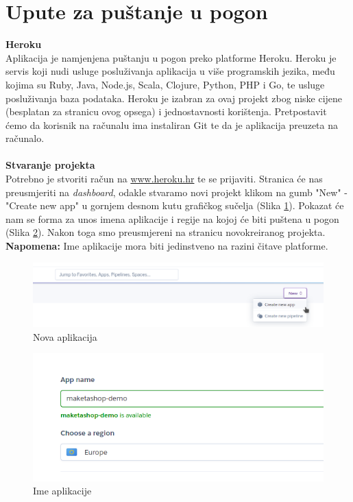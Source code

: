 		\section{Upute za puštanje u pogon}
			\noindent\textbf{Heroku}\\
			Aplikacija je namjenjena puštanju u pogon preko platforme Heroku. Heroku je servis koji nudi usluge posluživanja aplikacija u više programskih jezika, među kojima su Ruby, Java, Node.js, Scala, Clojure, Python, PHP i Go, te usluge posluživanja baza podataka. Heroku je izabran za ovaj projekt zbog niske cijene (besplatan za stranicu ovog opsega) i jednostavnosti korištenja. Pretpostavit ćemo da korisnik na računalu ima instaliran Git te da je aplikacija preuzeta na računalo.
			\\\\
			\noindent\textbf{Stvaranje projekta}\\
			Potrebno je stvoriti račun na  \href{www.heroku.hr}{www.heroku.hr} te se prijaviti. Stranica će nas preusmjeriti na \textit{dashboard}, odakle stvaramo novi projekt klikom na gumb "New" - "Create new app" u gornjem desnom kutu grafičkog sučelja (Slika \ref{fig:newapp}). Pokazat će nam se forma za unos imena aplikacije i regije na kojoj će biti puštena u pogon (Slika \ref{fig:nameapp}). Nakon toga smo preusmjereni na stranicu novokreiranog projekta.
			\textbf{Napomena:} Ime aplikacije mora biti jedinstveno na razini čitave platforme. 
			\begin{figure}[H]
				\includegraphics[width=.9\linewidth]{slike/20210114_203519.png}
				\centering
				\caption{Nova aplikacija}
				\label{fig:newapp}
			\end{figure}
			\begin{figure}[H]
				\includegraphics[width=.9\linewidth]{slike/20210114_203555.png}
				\centering
				\caption{Ime aplikacije}
				\label{fig:nameapp}
			\end{figure}

